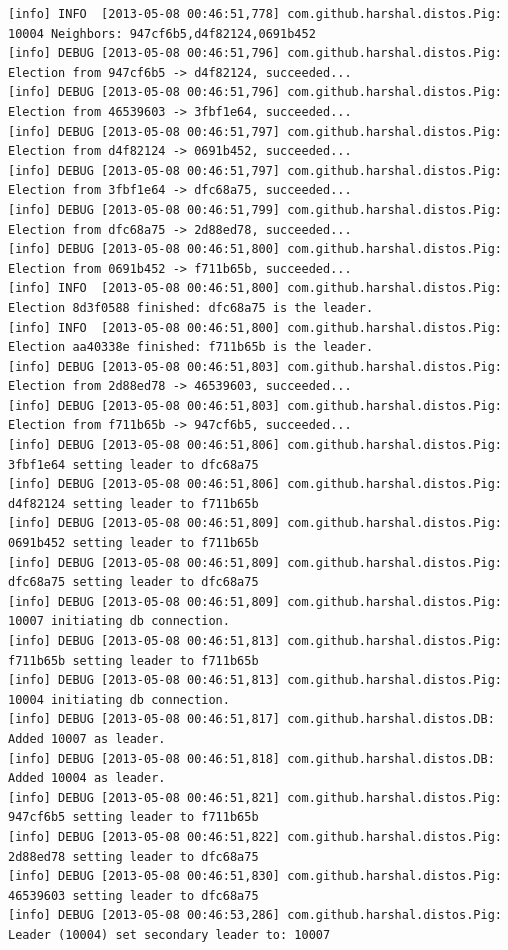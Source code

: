 \documentclass[]{article}
\begin{document}
\begin{verbatim}
[info] INFO  [2013-05-08 00:46:51,778] com.github.harshal.distos.Pig: 10004 Neighbors: 947cf6b5,d4f82124,0691b452
[info] DEBUG [2013-05-08 00:46:51,796] com.github.harshal.distos.Pig: Election from 947cf6b5 -> d4f82124, succeeded...
[info] DEBUG [2013-05-08 00:46:51,796] com.github.harshal.distos.Pig: Election from 46539603 -> 3fbf1e64, succeeded...
[info] DEBUG [2013-05-08 00:46:51,797] com.github.harshal.distos.Pig: Election from d4f82124 -> 0691b452, succeeded...
[info] DEBUG [2013-05-08 00:46:51,797] com.github.harshal.distos.Pig: Election from 3fbf1e64 -> dfc68a75, succeeded...
[info] DEBUG [2013-05-08 00:46:51,799] com.github.harshal.distos.Pig: Election from dfc68a75 -> 2d88ed78, succeeded...
[info] DEBUG [2013-05-08 00:46:51,800] com.github.harshal.distos.Pig: Election from 0691b452 -> f711b65b, succeeded...
[info] INFO  [2013-05-08 00:46:51,800] com.github.harshal.distos.Pig: Election 8d3f0588 finished: dfc68a75 is the leader.
[info] INFO  [2013-05-08 00:46:51,800] com.github.harshal.distos.Pig: Election aa40338e finished: f711b65b is the leader.
[info] DEBUG [2013-05-08 00:46:51,803] com.github.harshal.distos.Pig: Election from 2d88ed78 -> 46539603, succeeded...
[info] DEBUG [2013-05-08 00:46:51,803] com.github.harshal.distos.Pig: Election from f711b65b -> 947cf6b5, succeeded...
[info] DEBUG [2013-05-08 00:46:51,806] com.github.harshal.distos.Pig: 3fbf1e64 setting leader to dfc68a75
[info] DEBUG [2013-05-08 00:46:51,806] com.github.harshal.distos.Pig: d4f82124 setting leader to f711b65b
[info] DEBUG [2013-05-08 00:46:51,809] com.github.harshal.distos.Pig: 0691b452 setting leader to f711b65b
[info] DEBUG [2013-05-08 00:46:51,809] com.github.harshal.distos.Pig: dfc68a75 setting leader to dfc68a75
[info] DEBUG [2013-05-08 00:46:51,809] com.github.harshal.distos.Pig: 10007 initiating db connection.
[info] DEBUG [2013-05-08 00:46:51,813] com.github.harshal.distos.Pig: f711b65b setting leader to f711b65b
[info] DEBUG [2013-05-08 00:46:51,813] com.github.harshal.distos.Pig: 10004 initiating db connection.
[info] DEBUG [2013-05-08 00:46:51,817] com.github.harshal.distos.DB: Added 10007 as leader.
[info] DEBUG [2013-05-08 00:46:51,818] com.github.harshal.distos.DB: Added 10004 as leader.
[info] DEBUG [2013-05-08 00:46:51,821] com.github.harshal.distos.Pig: 947cf6b5 setting leader to f711b65b
[info] DEBUG [2013-05-08 00:46:51,822] com.github.harshal.distos.Pig: 2d88ed78 setting leader to dfc68a75
[info] DEBUG [2013-05-08 00:46:51,830] com.github.harshal.distos.Pig: 46539603 setting leader to dfc68a75
[info] DEBUG [2013-05-08 00:46:53,286] com.github.harshal.distos.Pig: Leader (10004) set secondary leader to: 10007

\end{verbatim}
\end{document}
